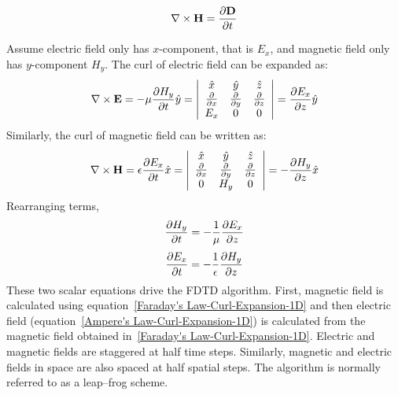 \documentclass{report}
\begin{document}
\begin{equation}
\centering
\nabla \times \textbf{H} = \dfrac{\partial \textbf{D}}{\partial t}
\label{Ampere's Law}
\end{equation}

Assume electric field only has $x$-component, that is $E_x$, and magnetic field only has $y$-component $H_y$. The curl of electric field can be expanded as:
\begin{equation}
\centering
\nabla \times \textbf{E} = - \mu \dfrac{\partial H_y}{\partial t} \hat{y} = \left| \begin{array}{ccc} \hat{x} & \hat{y} & \hat{z} \\ \frac{\partial}{\partial x} & \frac{\partial}{\partial y} & \frac{\partial}{\partial z} \\ E_x & 0 & 0 \end{array} \right| = \dfrac{\partial E_x}{\partial z} \hat{y}
\label{Faraday's Law-Curl-Expansion}
\end{equation}
Similarly, the curl of magnetic field can be written as:
\begin{equation}
\centering
\nabla \times \textbf{H} = \epsilon \dfrac{\partial E_x}{\partial t} \hat{x} = \left| \begin{array}{ccc} \hat{x} & \hat{y} & \hat{z} \\ \frac{\partial}{\partial x} & \frac{\partial}{\partial y} & \frac{\partial}{\partial z} \\ 0 & H_y & 0 \end{array} \right| = - \dfrac{\partial H_y}{\partial z} \hat{x}
\label{Ampere's Law-Curl-Expansion}
\end{equation}
Rearranging terms,
\begin{equation}
\centering
\dfrac{\partial H_y}{\partial t} = - \dfrac{1}{\mu} \dfrac{\partial E_x}{\partial z}
\label{Faraday's Law-Curl-Expansion-1D}
\end{equation}
\begin{equation}
\centering
\dfrac{\partial E_x}{\partial t} = - \dfrac{1}{\epsilon} \dfrac{\partial H_y}{\partial z}
\label{Ampere's Law-Curl-Expansion-1D}
\end{equation}
These two scalar equations drive the FDTD algorithm. First, magnetic field is calculated using equation~\ref{Faraday's Law-Curl-Expansion-1D} and then electric field (equation~\ref{Ampere's Law-Curl-Expansion-1D}) is calculated from the magnetic field obtained in~\ref{Faraday's Law-Curl-Expansion-1D}. Electric and magnetic fields are staggered at half time steps. Similarly, magnetic and electric fields in space are also spaced at half spatial steps. The algorithm is normally referred to as a leap--frog scheme.
\end{document}
